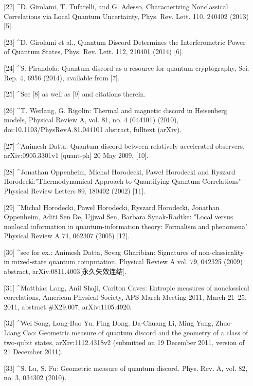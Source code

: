 [22]
^D. Girolami, T. Tufarelli, and G. Adesso, Characterizing Nonclassical Correlations via Local Quantum Uncertainty, Phys. Rev. Lett. 110, 240402 (2013) [5].

[23]
^D. Girolami et al., Quantum Discord Determines the Interferometric Power of Quantum States, Phys. Rev. Lett. 112, 210401 (2014) [6].

[24]
^S. Pirandola: Quantum discord as a resource for quantum cryptography, Sci. Rep. 4, 6956 (2014), available from [7].

[25]
^See [8] as well as [9] and citations therein.

[26]
^T. Werlang, G. Rigolin: Thermal and magnetic discord in Heisenberg models, Physical Review A, vol. 81, no. 4 (044101) (2010), doi:10.1103/PhysRevA.81.044101 abstract, fulltext (arXiv).

[27]
^Animesh Datta: Quantum discord between relatively accelerated observers, arXiv:0905.3301v1 [quant-ph] 20 May 2009, [10].

[28]
^Jonathan Oppenheim, Michał Horodecki, Paweł Horodecki and Ryszard Horodecki:"Thermodynamical Approach to Quantifying Quantum Correlations" Physical Review Letters 89, 180402 (2002) [11].

[29]
^Michał Horodecki, Paweł Horodecki, Ryszard Horodecki, Jonathan Oppenheim, Aditi Sen De, Ujjwal Sen, Barbara Synak-Radtke: "Local versus nonlocal information in quantum-information theory: Formalism and phenomena" Physical Review A 71, 062307 (2005) [12].

[30]
^see for ex.: Animesh Datta, Sevag Gharibian: Signatures of non-classicality in mixed-state quantum computation, Physical Review A vol. 79, 042325 (2009) abstract, arXiv:0811.4003[永久失效连结].

[31]
^Matthias Lang, Anil Shaji, Carlton Caves: Entropic measures of nonclassical correlations, American Physical Society, APS March Meeting 2011, March 21–25, 2011, abstract #X29.007, arXiv:1105.4920.

[32]
^Wei Song, Long-Bao Yu, Ping Dong, Da-Chuang Li, Ming Yang, Zhuo-Liang Cao: Geometric measure of quantum discord and the geometry of a class of two-qubit states, arXiv:1112.4318v2 (submitted on 19 December 2011, version of 21 December 2011).

[33]
^S. Lu, S. Fu: Geometric measure of quantum discord, Phys. Rev. A, vol. 82, no. 3, 034302 (2010).